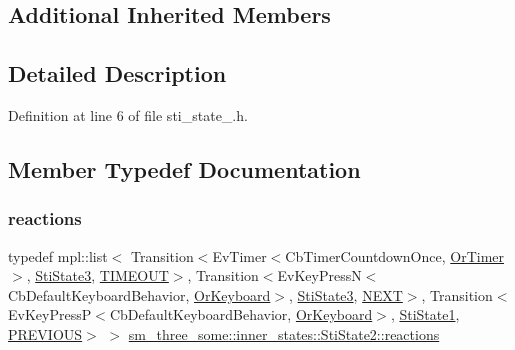 \subsection*{Additional Inherited Members}


\subsection{Detailed Description}


Definition at line 6 of file sti\+\_\+state\+\_.\+h.



\subsection{Member Typedef Documentation}
\mbox{\label{structsm__three__some_1_1inner__states_1_1StiState2_a35556a3ab61ab56f2aa5d896b8330082}} 
\subsubsection{\texorpdfstring{reactions}{reactions}}
{\footnotesize\ttfamily typedef mpl\+::list$<$ Transition$<$Ev\+Timer$<$Cb\+Timer\+Countdown\+Once, \hyperlink{classsm__three__some_1_1OrTimer}{Or\+Timer}$>$, \hyperlink{structsm__three__some_1_1inner__states_1_1StiState3}{Sti\+State3}, \hyperlink{structsm__three__some_1_1inner__states_1_1StiState2_1_1TIMEOUT}{T\+I\+M\+E\+O\+UT}$>$, Transition$<$Ev\+Key\+PressN$<$Cb\+Default\+Keyboard\+Behavior, \hyperlink{classsm__three__some_1_1OrKeyboard}{Or\+Keyboard}$>$, \hyperlink{structsm__three__some_1_1inner__states_1_1StiState3}{Sti\+State3}, \hyperlink{structsm__three__some_1_1inner__states_1_1StiState2_1_1NEXT}{N\+E\+XT}$>$, Transition$<$Ev\+Key\+PressP$<$Cb\+Default\+Keyboard\+Behavior, \hyperlink{classsm__three__some_1_1OrKeyboard}{Or\+Keyboard}$>$, \hyperlink{structsm__three__some_1_1inner__states_1_1StiState1}{Sti\+State1}, \hyperlink{structsm__three__some_1_1inner__states_1_1StiState2_1_1PREVIOUS}{P\+R\+E\+V\+I\+O\+US}$>$ $>$ \hyperlink{structsm__three__some_1_1inner__states_1_1StiState2_a35556a3ab61ab56f2aa5d896b8330082}{sm\+\_\+three\+\_\+some\+::inner\+\_\+states\+::\+Sti\+State2\+::reactions}}



